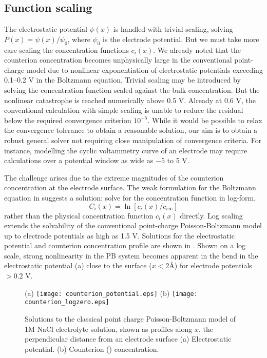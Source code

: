 \subsection{Function scaling}
The electrostatic potential $\psi(x)$ is handled with trivial
scaling, solving $P(x)=\psi(x)/\psi_0$, where $\psi_0$ is the
electrode potential.
But we must take more care scaling the concentration functions
$c_i(x)$.
We already noted that the counterion concentration becomes unphysically
large in the conventional point-charge model due to nonlinear
exponentiation of  electrostatic potentials exceeding 0.1--0.2 V in
the Boltzmann equation. Trivial scaling may be introduced by solving
the concentration function scaled against the bulk concentration. But
 the nonlinear catastrophe is reached
numerically above 0.5 V. Already at 0.6 V, the conventional
calculation with simple scaling is unable to reduce the residual below
the required convergence criterion  $10^{-5}$. While it would be possible to relax the
convergence tolerance to obtain a reasonable solution, our aim is to
obtain a robust general solver not requiring close manipulation of
convergence criteria. For instance,  modelling the
cyclic voltammetry curve of an electrode may require calculations
over a potential window as wide as $-5$ to 5 V.

The challenge arises due to the extreme magnitudes of the counterion
concentration at the electrode surface. The weak formulation for the
Boltzmann equation in  suggests a solution:
solve for the concentration function in log-form,
\begin{equation}
C_{i}(x) = \ln[ c_{i}(x) / c_{i\infty}]
\label{log_scaling}
\end{equation}
rather than the physical concentration function $c_{i}(x)$ directly. Log
scaling extends the solvability of the conventional point-charge Poisson-Boltzmann
model up to electrode potentials as high as 1.5 V. Solutions for the
electrostatic potential and counterion concentration profile are shown
in . Shown on a log scale, strong
nonlinearity in the PB system becomes apparent in the bend in the
electrostatic potential (a) close to the
surface ($x<2$\AA) for electrode potentials $> 0.2$ V.

\begin{figure}
\centering
(a)
\texttt{[image: counterion\_potential.eps]}
(b)
\texttt{[image: counterion\_logzero.eps]}
\caption{\label{fig_classical_PB}Solutions to the classical point
  charge Poisson-Boltzmann model of 1M NaCl electrolyte solution,
  shown as profiles along $x$, the perpendicular distance from an
  electrode surface (a) Electrostatic potential. (b) Counterion
  () concentration. }
\end{figure}

